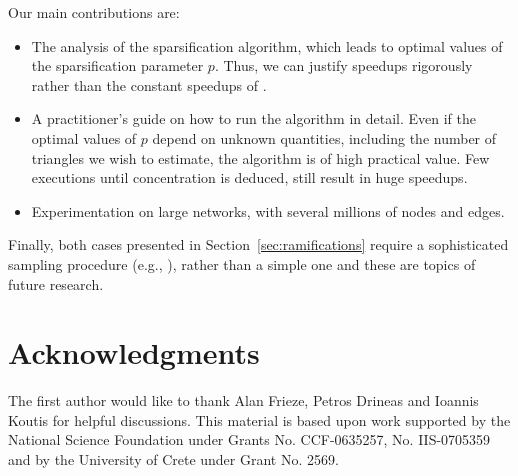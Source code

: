 \documentclass{llncs}
\begin{document}
Our main contributions are:
\begin{itemize}
\item The analysis of the sparsification algorithm, which leads to optimal values of the 
sparsification parameter $p$. Thus, we can justify speedups rigorously rather than the constant speedups of  \cite{Tsourakakiskdd09}.
\item A practitioner's guide on how to run the algorithm in detail. Even if the optimal values
of $p$ depend on unknown quantities, including the number of triangles we wish to estimate, 
the algorithm is of high practical value. Few executions until concentration is deduced, still result 
in huge speedups. 
\item Experimentation on large networks, with several millions of nodes and edges.
\end{itemize}

Finally, both cases presented in Section~\ref{sec:ramifications} require a sophisticated sampling procedure (e.g., \cite{spielman:spielman}), 
rather than a simple one and these are topics of future research. 

\section{Acknowledgments}
The first author would like to thank Alan Frieze, Petros Drineas and Ioannis Koutis for helpful discussions. 
This material is based upon work supported by the National Science Foundation under Grants No. CCF-0635257,
No. IIS-0705359 and by the University of Crete under Grant No. 2569.
\end{document}
